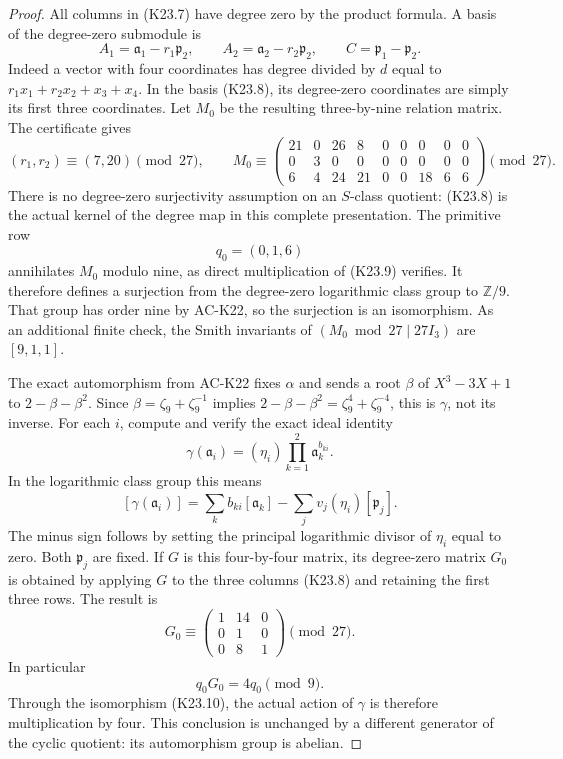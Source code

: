 \begin{proof}
All columns in (K23.7) have degree zero by the product formula.
A basis of the degree-zero submodule is
\[
 A_1=\mathfrak a_1-r_1\mathfrak p_2,
 \qquad A_2=\mathfrak a_2-r_2\mathfrak p_2,
 \qquad C=\mathfrak p_1-\mathfrak p_2.                 \tag{K23.8}
\]
Indeed a vector with four coordinates has degree divided
by $d$ equal to $r_1x_1+r_2x_2+x_3+x_4$.
In the basis (K23.8), its degree-zero coordinates are
simply its first three coordinates.
Let $M_0$ be the resulting three-by-nine relation matrix.
The certificate gives
\[
 (r_1,r_2)\equiv(7,20)\pmod{27},\qquad
 M_0\equiv
 \begin{pmatrix}
 21&0&26&8&0&0&0&0&0\\
 0&3&0&0&0&0&0&0&0\\
 6&4&24&21&0&0&18&6&6
 \end{pmatrix}\pmod{27}.                             \tag{K23.9}
\]
There is no degree-zero surjectivity assumption on an
$S$-class quotient: (K23.8) is the actual kernel of the
degree map in this complete presentation.
The primitive row
\[
                         q_0=(0,1,6)                 \tag{K23.10}
\]
annihilates $M_0$ modulo nine, as direct multiplication
of (K23.9) verifies.
It therefore defines a surjection from the degree-zero
logarithmic class group to $\mathbb Z/9$.
That group has order nine by AC-K22, so the surjection
is an isomorphism.
As an additional finite check, the Smith invariants of
$(M_0\bmod27\mid27I_3)$ are $[9,1,1]$.

The exact automorphism from AC-K22 fixes $\alpha$ and
sends a root $\beta$ of $X^3-3X+1$ to $2-\beta-\beta^2$.
Since
$\beta=\zeta_9+\zeta_9^{-1}$ implies
$2-\beta-\beta^2=\zeta_9^4+\zeta_9^{-4}$,
this is $\gamma$, not its inverse.
For each $i$, compute and verify the exact ideal identity
\[
       \gamma(\mathfrak a_i)=(\eta_i)
                       \prod_{k=1}^2\mathfrak a_k^{b_{ki}}.
                                                        \tag{K23.11}
\]
In the logarithmic class group this means
\[
       [\gamma(\mathfrak a_i)]
        =\sum_k b_{ki}[\mathfrak a_k]
                    -\sum_j v_j(\eta_i)[\mathfrak p_j].
                                                        \tag{K23.12}
\]
The minus sign follows by setting the principal
logarithmic divisor of $\eta_i$ equal to zero.
Both $\mathfrak p_j$ are fixed.
If $G$ is this four-by-four matrix, its degree-zero
matrix $G_0$ is obtained by applying $G$ to the three
columns (K23.8) and retaining the first three rows.
The result is
\[
                 G_0\equiv
                    \begin{pmatrix}1&14&0\\0&1&0\\0&8&1\end{pmatrix}
                            \pmod{27}.                \tag{K23.13}
\]
In particular
\[
                         q_0G_0=4q_0\pmod9.           \tag{K23.14}
\]
Through the isomorphism (K23.10), the actual action of
$\gamma$ is therefore multiplication by four.
This conclusion is unchanged by a different generator
of the cyclic quotient: its automorphism group is abelian.


\end{proof}
